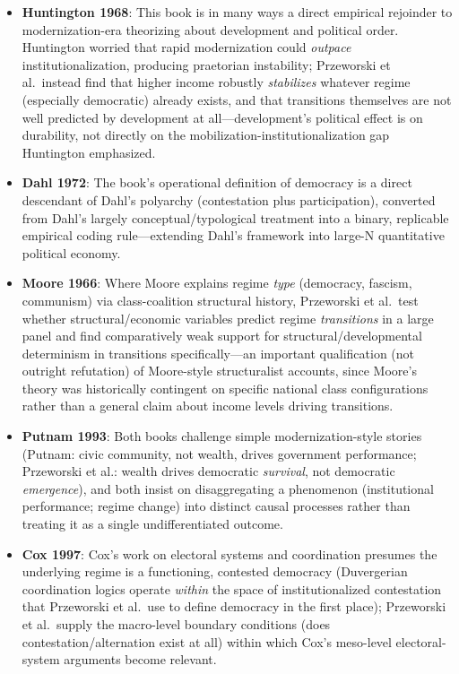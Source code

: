 \documentclass[12pt]{article}
\begin{document}
\begin{itemize}[leftmargin=*, itemsep=4pt]
    \item \textbf{Huntington 1968}: This book is in many ways a direct empirical rejoinder to modernization-era theorizing about development and political order. Huntington worried that rapid modernization could \textit{outpace} institutionalization, producing praetorian instability; Przeworski et al.\ instead find that higher income robustly \textit{stabilizes} whatever regime (especially democratic) already exists, and that transitions themselves are not well predicted by development at all---development's political effect is on durability, not directly on the mobilization-institutionalization gap Huntington emphasized.
    \item \textbf{Dahl 1972}: The book's operational definition of democracy is a direct descendant of Dahl's polyarchy (contestation plus participation), converted from Dahl's largely conceptual/typological treatment into a binary, replicable empirical coding rule---extending Dahl's framework into large-N quantitative political economy.
    \item \textbf{Moore 1966}: Where Moore explains regime \textit{type} (democracy, fascism, communism) via class-coalition structural history, Przeworski et al.\ test whether structural/economic variables predict regime \textit{transitions} in a large panel and find comparatively weak support for structural/developmental determinism in transitions specifically---an important qualification (not outright refutation) of Moore-style structuralist accounts, since Moore's theory was historically contingent on specific national class configurations rather than a general claim about income levels driving transitions.
    \item \textbf{Putnam 1993}: Both books challenge simple modernization-style stories (Putnam: civic community, not wealth, drives government performance; Przeworski et al.: wealth drives democratic \textit{survival}, not democratic \textit{emergence}), and both insist on disaggregating a phenomenon (institutional performance; regime change) into distinct causal processes rather than treating it as a single undifferentiated outcome.
    \item \textbf{Cox 1997}: Cox's work on electoral systems and coordination presumes the underlying regime is a functioning, contested democracy (Duvergerian coordination logics operate \textit{within} the space of institutionalized contestation that Przeworski et al.\ use to define democracy in the first place); Przeworski et al.\ supply the macro-level boundary conditions (does contestation/alternation exist at all) within which Cox's meso-level electoral-system arguments become relevant.

\end{itemize}
\end{document}
